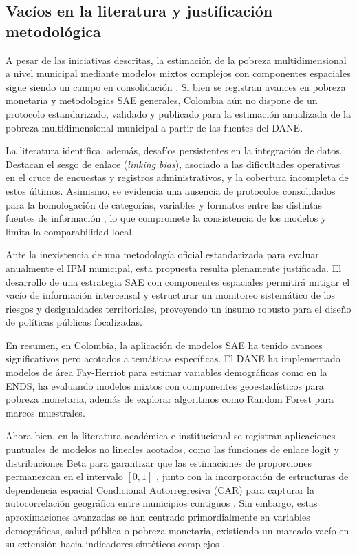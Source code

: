 \subsection{Vacíos en la literatura y justificación metodológica}
        A pesar de las iniciativas descritas, la estimación de la pobreza multidimensional a nivel municipal mediante modelos mixtos complejos con componentes espaciales sigue siendo un campo en consolidación \cite{dane2024}. Si bien se registran avances en pobreza monetaria y metodologías SAE generales, Colombia aún no dispone de un protocolo estandarizado, validado y publicado para la estimación anualizada de la pobreza multidimensional municipal a partir de las fuentes del DANE.
    
        La literatura identifica, además, desafíos persistentes en la integración de datos. Destacan el sesgo de enlace (\textit{linking bias}), asociado a las dificultades operativas en el cruce de encuestas y registros administrativos, y la cobertura incompleta de estos últimos. Asimismo, se evidencia una ausencia de protocolos consolidados para la homologación de categorías, variables y formatos entre las distintas fuentes de información \cite{dane2024}, lo que compromete la consistencia de los modelos y limita la comparabilidad local.
    
        Ante la inexistencia de una metodología oficial estandarizada para evaluar anualmente el IPM municipal, esta propuesta resulta plenamente justificada. El desarrollo de una estrategia SAE con componentes espaciales permitirá mitigar el vacío de información intercensal y estructurar un monitoreo sistemático de los riesgos y desigualdades territoriales, proveyendo un insumo robusto para el diseño de políticas públicas focalizadas.

En resumen, en Colombia, la aplicación de modelos SAE ha tenido avances significativos pero acotados a temáticas específicas. El DANE ha implementado modelos de área Fay-Herriot para estimar variables demográficas como en la ENDS, ha evaluando modelos mixtos con componentes geoestadísticos para pobreza monetaria, además de explorar algoritmos como Random Forest para marcos muestrales.

Ahora bien, en la literatura académica e institucional se registran aplicaciones puntuales de modelos no lineales acotados, como las funciones de enlace logit y distribuciones Beta para garantizar que las estimaciones de proporciones permanezcan en el intervalo $[0,1]$ \cite{hobza2016small, corral2021pulling}, junto con la incorporación de estructuras de dependencia espacial Condicional Autorregresiva (CAR) para capturar la autocorrelación geográfica entre municipios contiguos \cite{besag1974spatial}. Sin embargo, estas aproximaciones avanzadas se han centrado primordialmente en variables demográficas, salud pública o pobreza monetaria, existiendo un marcado vacío en su extensión hacia indicadores sintéticos complejos \cite{corral2021pulling}. 

